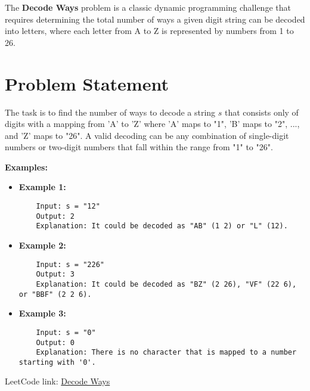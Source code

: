 
\label{problem:decode_ways}

The \textbf{Decode Ways} problem is a classic dynamic programming challenge that requires determining the total number of ways a given digit string can be decoded into letters, where each letter from A to Z is represented by numbers from 1 to 26.

\section*{Problem Statement}

The task is to find the number of ways to decode a string \( s \) that consists only of digits with a mapping from 'A' to 'Z' where 'A' maps to "1", 'B' maps to "2", ..., and 'Z' maps to "26". A valid decoding can be any combination of single-digit numbers or two-digit numbers that fall within the range from "1" to "26".

\textbf{Examples:}

\begin{itemize}
    \item \textbf{Example 1:}
    \begin{verbatim}
    Input: s = "12"
    Output: 2
    Explanation: It could be decoded as "AB" (1 2) or "L" (12).
    \end{verbatim}

    \item \textbf{Example 2:}
    \begin{verbatim}
    Input: s = "226"
    Output: 3
    Explanation: It could be decoded as "BZ" (2 26), "VF" (22 6), or "BBF" (2 2 6).
    \end{verbatim}

    \item \textbf{Example 3:}
    \begin{verbatim}
    Input: s = "0"
    Output: 0
    Explanation: There is no character that is mapped to a number starting with '0'.
    \end{verbatim}
\end{itemize}

LeetCode link: \href{https://leetcode.com/problems/decode-ways/}{Decode Ways}


